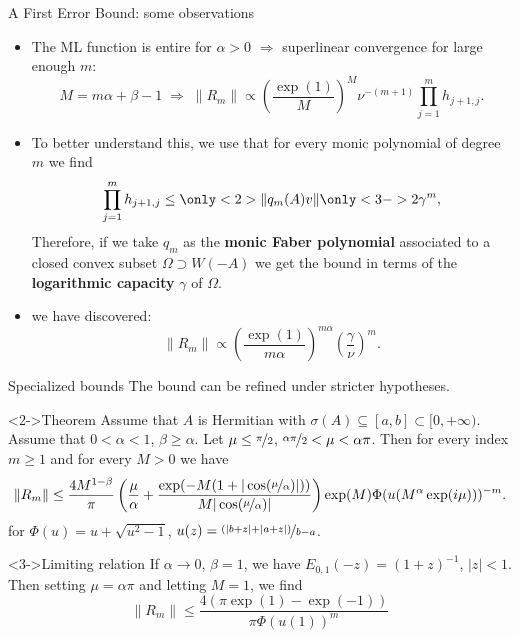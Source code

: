 \documentclass[aspectratio=169,xcolor=dvipsnames]{beamer}
\begin{document}
\begin{frame}{A First Error Bound: some observations}

\begin{itemize}
	\item<1->[\faCog] The ML function is entire for $\alpha > 0$ $\Rightarrow$ superlinear convergence for large enough $m$:
	\[
	M = m\alpha + \beta -1 \;\Rightarrow\; \|R_m\| \propto \left( \frac{\exp(1)}{M} \right)^M \nu^{-(m+1)} \prod_{j=1}^{m} h_{j+1,j}.
	\]
	\item<2->[\faCog] To better understand this, we use that for every monic polynomial of degree $m$ we find
	\[
	\prod_{j=1}^{m} h_{j+1,j} \leq \only<2>{\|q_m(A) v \|}\only<3->{2 \gamma^m},
	\]
	Therefore, if we take $q_m$ as the \alert{\textbf{monic Faber polynomial}} associated to a closed convex subset $\Omega \supset W(-A)$ we get the bound in terms of the \textbf{logarithmic capacity} $\gamma$ of $\Omega$.
	\item<3->[$\Rightarrow$] we have discovered:
	\[
	\|R_m\| \propto \left( \frac{\exp(1)}{m\alpha} \right)^{m\alpha} \left( \frac{\gamma}{\nu} \right)^m.
	\]
\end{itemize}

\end{frame}

\begin{frame}{Specialized bounds}
The bound can be refined under stricter hypotheses.

\begin{alertblock}<2->{Theorem \parencite[Theorem~3.5]{MoretNovatiML}}
Assume that $A$ is Hermitian with $\sigma(A) \subseteq [a,b] \subset [0,+\infty)$. Assume that $0 < \alpha < 1$, $\beta \geq \alpha$. Let $\mu \leq \nicefrac{\pi}{2}$, $\nicefrac{\alpha\pi}{2} < \mu < \alpha \pi$. Then for every index $m \geq 1$ and for every $M > 0$ we have
\[
\|R_m\| \leq \frac{4 M^{1-\beta}}{\pi} \left(\frac{\mu}{\alpha} + \frac{\exp(-M(1 + |\cos(\nicefrac{\mu}{\alpha})|))}{M |\cos(\nicefrac{\mu}{\alpha})| } \right) \exp(M) \Phi( u(M^\alpha \exp(i\mu) ) )^{-m}.
\]
for $\Phi(u) = u + \sqrt{u^2-1}$, $u(z) = \nicefrac{(|b+z|+|a+z|)}{b-a}$.
\end{alertblock}

\begin{exampleblock}<3->{Limiting relation}
If $\alpha \rightarrow 0$, $\beta = 1$, we have $E_{0,1}(-z) = (1+z)^{-1}$, $|z| < 1$. Then setting $\mu = \alpha \pi$ and letting $M=1$, we find\vspace{-0.5em}
\[
\|R_m\| \leq \frac{4 (\pi \exp(1)-\exp(-1)) }{\pi \Phi(u(1))^m}
\]
\end{exampleblock}

\end{frame}
\end{document}
